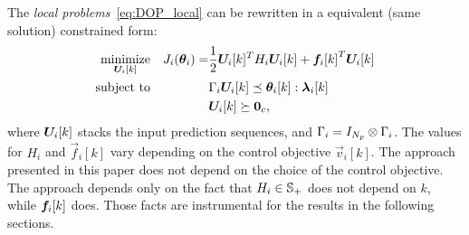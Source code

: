\documentclass{ifacconf}  %
\begin{document}
The \emph{local problems}~\eqref{eq:DOP_local} can be rewritten in a equivalent (same solution) constrained \qp{} form:
  \begin{subequations}\label{eq:quadratic_case}
    \begin{align}
      \label{eq:4}
      \underset{\Uik}{\mathrm{minimize}}&&\small J_{i}(\vec{\theta}_{i})=&\frac{1}{2} \Uik^T H_i\Uik +{\fik}^T\Uik\\
      \mathrm{subject~ to}&&&\bar{\Gamma}_{i}\Uik\preceq\vec{\theta}_{i}[k]:\vec{\lambda}_{i}[k]\label{eq:constraints}\\
                                        &&&\Uik\succeq\0_{c},
    \end{align}
  \end{subequations}
where ${\Uik}$ stacks the input prediction sequences, and
${\relax{\Gamma}_{i}=I_{N_{p}}\mathbin{\otimes}\Gamma_{i}}$.
The values for $H_{i}$ and $\vec{f}_{i}[k]$ vary depending on the control objective $\vec{v}_{i}[k]$. The approach presented in this paper does not depend on the choice of the control objective.
The approach depends only on the fact that ${H_{i}\in\mathbb{S}_{+}}$ does not depend on $k$, while $\fik$ does. Those facts are instrumental for the results in the following sections.

\end{document}
